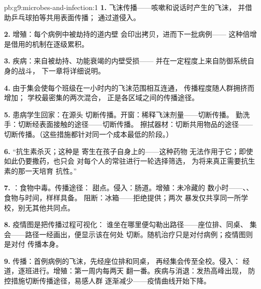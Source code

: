 \begin{solution}{pb:g9:microbes-and-infection:1}
\textbf{1.} 飞沫传播——咳嗽和说话时产生的飞沫，
并借助乒乓球拍等共用表面传播；
通过道侵入。

\textbf{2.} 增殖：每个病例中被劫持的道内壁
会印出拷贝，进而下一批病例——
这种倍增是借用的机制在逐级累积。

\textbf{3.} 疾病：来自被劫持、功能衰竭的内壁受损——
并在一定程度上来自防御系统自身的战斗，
下一章将详细说明。

\textbf{4.} 由于集会使每个班级在一小时内的飞沫范围相互连通，
传播程度随人群拥挤而增加；
学校最密集的两次混合，
正是各区域之间的传播途径。

\textbf{5.} 患病学生回家：在源头
切断传播。开窗：稀释飞沫剂量——切断传播。
勤洗手：切断经表面接触的途径——切断传播。
擦拭器材：切断共用物品的途径——
切断传播。（这些措施都针对同一个成本最低的阶段。）

\textbf{6.} “抗生素杀灭；这种是
寄生在孩子自身上的——这种药物
无法作用于它；即使如此仍要撒药，也只会
对每个人的常驻进行一轮选择筛选，
为将来真正需要抗生素的那一天培育
抗性。”

\textbf{7.} ：食物中毒。传播途径：
甜点。侵入：肠道。增殖：未冷藏的
数小时——、、食物与时间，样样具备。
阻断：冰箱——拒绝提供；两次
暴发仅共享同一所学校，别无其他共同点。

\textbf{8.} 疫情图是把传播过程可视化：
谁坐在哪里便勾勒出路径——座位排、同桌、
集会——路径一经画出，便显示该在何处
切断。随机治疗只是对付病例；疫情图则是对付
传播本身。

\textbf{9.} 传播：首例病例的飞沫，先经座位排和同桌，
再经集会传至全校。侵入：
经道，逐班进行。增殖：第一周内每两天
翻一番。疾病与消退：发热高峰出现，
防控措施切断传播途径，易感人群
逐渐减少——疫情曲线开始下降。


\end{solution}
